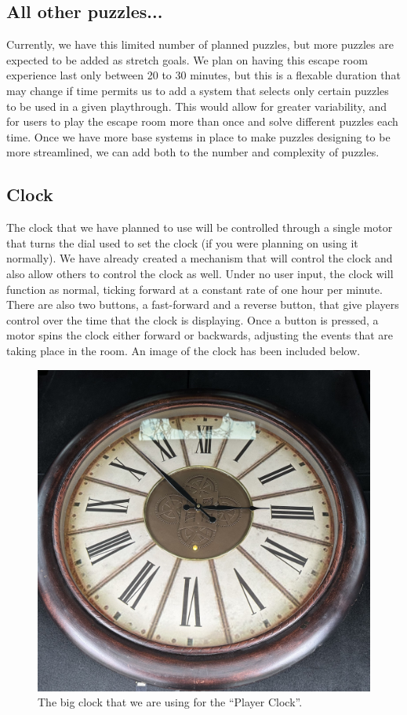 \documentclass[conference]{IEEEtran}
\begin{document}
\subsection{All other puzzles...}
Currently, we have this limited number of planned puzzles, but more puzzles are expected to be added
as stretch goals. We plan on having this escape room experience last only between 20 to 30 minutes,
but this is a flexable duration that may change if time permits us to add a system that selects
only certain puzzles to be used in a given playthrough. This would allow for greater variability,
and for users to play the escape room more than once and solve different puzzles each time.
Once we have more base systems in place to make puzzles designing to be more streamlined, we can add
both to the number and complexity of puzzles.

\subsection*{Clock}
The clock that we have planned to use will be controlled through a single motor that turns the
dial used to set the clock (if you were planning on using it normally). We have already created
a mechanism that will control the clock and also allow others to control the clock as well. Under
no user input, the clock will function as normal, ticking forward at a constant rate of one hour per
minute. There are also two buttons, a fast-forward and a reverse button, that give players control
over the time that the clock is displaying. Once a button is pressed, a motor spins the clock
either forward or backwards, adjusting the events that are taking place in the room. An image of
the clock has been included below.

\begin{figure}[ht]
    \centering
    \includegraphics[width=0.85\columnwidth]{Images/big-clock.jpg}
    \caption{The big clock that we are using for the ``Player Clock''.}
\end{figure}
\end{document}
